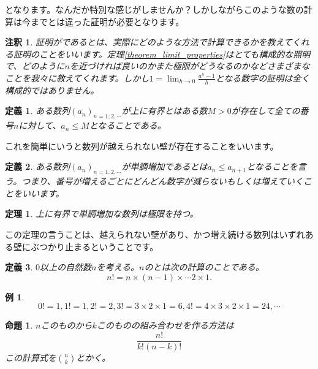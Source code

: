 \documentclass{ltjsarticle}
\newtheorem{theorem}{定理}[section]
\newtheorem{proposition}{命題}[section]
\newtheorem{definition}{定義}[section]
\newtheorem{remark}{注釈}[section]
\newtheorem{example}{例}[section]
\begin{document}
となります。なんだか特別な感じがしませんか？しかしながらこのような数の計算は今までとは違った証明が必要となります。
\begin{remark}
証明がであるとは、実際にどのような方法で計算できるかを教えてくれる証明のことをいいます。定理\ref{theorem_limit_properties}はとても構成的な照明で、どのように$n$を近づければ良いのかまた極限がどうなるのかなどさまざまなことを我々に教えてくれます。しかし$1=\lim_{h\to0}{\frac {a^h-1} h}$となる数字の証明は全く構成的ではありません。
\end{remark}

\begin{definition}
ある数列$(a_n)_{n=1,2,\cdots}$が上に有界とはある数$M>0$が存在して全ての番号$n$に対して、$a_n\leq M$となることである。
\end{definition}

これを簡単にいうと数列が越えられない壁が存在することをいいます。

\begin{definition}
ある数列$(a_n)_{n=1,2,\cdots}$が単調増加であるとは$a_n\leq a_{n+1}$となることを言う。つまり、番号が増えるごとにどんどん数字が減らないもしくは増えていくことをいいます。
\end{definition}

\begin{theorem}
上に有界で単調増加な数列は極限を持つ。
\label{weierstrass_bolzano}
\end{theorem}

この定理の言うことは、越えられない壁があり、かつ増え続ける数列はいずれある壁にぶつかり止まるということです。

\begin{definition}
$0$以上の自然数$n$を考える。$n$のとは次の計算のことである。
\begin{equation*}
n! = n\times(n-1)\times\cdots2\times1.
\end{equation*}
\end{definition}
\begin{example}
\begin{equation*}
0! = 1, 1!=1, 2! = 2, 3! = 3 \times 2 \times 1 = 6, 4! = 4\times 3\times 2\times 1 = 24,\cdots
\end{equation*}
\end{example}

\begin{proposition}
$n$このものから$k$このものの組み合わせを作る方法は
\begin{equation*}
{\frac {n!} {k!(n-k)!}}
\end{equation*}
この計算式を${n \choose k}$とかく。
\end{proposition}
\end{document}

